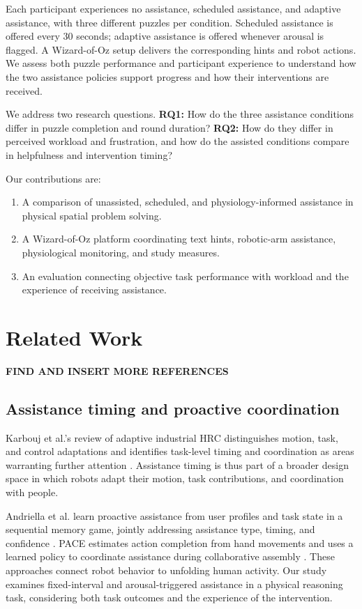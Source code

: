 \documentclass[sigconf,anonymous]{aamas}
\begin{document}
Each participant experiences no assistance, scheduled assistance, and adaptive assistance, with three different puzzles per condition. Scheduled assistance is offered every 30 seconds; adaptive assistance is offered whenever arousal is flagged. A Wizard-of-Oz setup delivers the corresponding hints and robot actions. We assess both puzzle performance and participant experience to understand how the two assistance policies support progress and how their interventions are received.

We address two research questions. \textbf{RQ1:} How do the three assistance conditions differ in puzzle completion and round duration? \textbf{RQ2:} How do they differ in perceived workload and frustration, and how do the assisted conditions compare in helpfulness and intervention timing?

Our contributions are:

\begin{enumerate}
\item A comparison of unassisted, scheduled, and physiology-informed assistance in physical spatial problem solving.
\item A Wizard-of-Oz platform coordinating text hints, robotic-arm assistance, physiological monitoring, and study measures.
\item An evaluation connecting objective task performance with workload and the experience of receiving assistance.
\end{enumerate}

\section{Related Work}

\textbf{FIND AND INSERT MORE REFERENCES}

\subsection{Assistance timing and proactive coordination}

Karbouj et al.'s review of adaptive industrial HRC distinguishes motion, task, and control adaptations and identifies task-level timing and coordination as areas warranting further attention \cite{karbouj2026}. Assistance timing is thus part of a broader design space in which robots adapt their motion, task contributions, and coordination with people.

Andriella et al. learn proactive assistance from user profiles and task state in a sequential memory game, jointly addressing assistance type, timing, and confidence \cite{andriella2025}. PACE estimates action completion from hand movements and uses a learned policy to coordinate assistance during collaborative assembly \cite{delazzari2025}. These approaches connect robot behavior to unfolding human activity. Our study examines fixed-interval and arousal-triggered assistance in a physical reasoning task, considering both task outcomes and the experience of the intervention.
\end{document}
